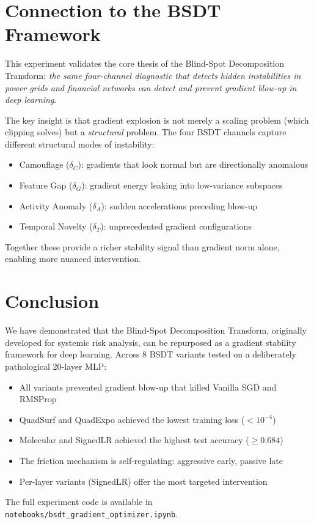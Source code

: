 \documentclass[11pt,a4paper]{article}
\begin{document}
\section{Connection to the BSDT Framework}

This experiment validates the core thesis of the Blind-Spot Decomposition Transform: \emph{the same four-channel diagnostic that detects hidden instabilities in power grids and financial networks can detect and prevent gradient blow-up in deep learning}.

The key insight is that gradient explosion is not merely a scaling problem (which clipping solves) but a \emph{structural} problem.  The four BSDT channels capture different structural modes of instability:

\begin{itemize}[nosep]
  \item Camouflage ($\delta_C$): gradients that look normal but are directionally anomalous
  \item Feature Gap ($\delta_G$): gradient energy leaking into low-variance subspaces
  \item Activity Anomaly ($\delta_A$): sudden accelerations preceding blow-up
  \item Temporal Novelty ($\delta_T$): unprecedented gradient configurations
\end{itemize}

Together these provide a richer stability signal than gradient norm alone, enabling more nuanced intervention.

\section{Conclusion}

We have demonstrated that the Blind-Spot Decomposition Transform, originally developed for systemic risk analysis, can be repurposed as a gradient stability framework for deep learning.  Across 8 BSDT variants tested on a deliberately pathological 20-layer MLP:

\begin{itemize}[nosep]
  \item All variants prevented gradient blow-up that killed Vanilla SGD and RMSProp
  \item QuadSurf and QuadExpo achieved the lowest training loss ($< 10^{-4}$)
  \item Molecular and SignedLR achieved the highest test accuracy ($\geq 0.684$)
  \item The friction mechanism is self-regulating: aggressive early, passive late
  \item Per-layer variants (SignedLR) offer the most targeted intervention
\end{itemize}

The full experiment code is available in \texttt{notebooks/bsdt\_gradient\_optimizer.ipynb}.
\end{document}

